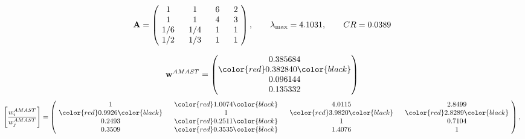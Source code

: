 \begin{example}
\begin{equation*}
\mathbf{A} =
\begin{pmatrix}
$\,\,$ 1 $\,\,$ & $\,\,$1$\,\,$ & $\,\,$6$\,\,$ & $\,\,$2 $\,\,$ \\
$\,\,$ 1 $\,\,$ & $\,\,$ 1 $\,\,$ & $\,\,$4$\,\,$ & $\,\,$3 $\,\,$ \\
$\,\,$ 1/6$\,\,$ & $\,\,$ 1/4$\,\,$ & $\,\,$ 1 $\,\,$ & $\,\,$1 $\,\,$ \\
$\,\,$ 1/2$\,\,$ & $\,\,$ 1/3$\,\,$ & $\,\,$ 1 $\,\,$ & $\,\,$ 1  $\,\,$ \\
\end{pmatrix},
\qquad
\lambda_{\max} =
4.1031,
\qquad
CR = 0.0389
\end{equation*}

\begin{equation*}
\mathbf{w}^{AMAST} =
\begin{pmatrix}
0.385684\\
\color{red} 0.382840\color{black} \\
0.096144\\
0.135332
\end{pmatrix}\end{equation*}
\begin{equation*}
\left[ \frac{{w}^{AMAST}_i}{{w}^{AMAST}_j} \right] =
\begin{pmatrix}
$\,\,$ 1 $\,\,$ & $\,\,$\color{red} 1.0074\color{black} $\,\,$ & $\,\,$4.0115$\,\,$ & $\,\,$2.8499$\,\,$ \\
$\,\,$\color{red} 0.9926\color{black} $\,\,$ & $\,\,$ 1 $\,\,$ & $\,\,$\color{red} 3.9820\color{black} $\,\,$ & $\,\,$\color{red} 2.8289\color{black}   $\,\,$ \\
$\,\,$0.2493$\,\,$ & $\,\,$\color{red} 0.2511\color{black} $\,\,$ & $\,\,$ 1 $\,\,$ & $\,\,$0.7104 $\,\,$ \\
$\,\,$0.3509$\,\,$ & $\,\,$\color{red} 0.3535\color{black} $\,\,$ & $\,\,$1.4076$\,\,$ & $\,\,$ 1  $\,\,$ \\
\end{pmatrix},
\end{equation*}


\end{example}
